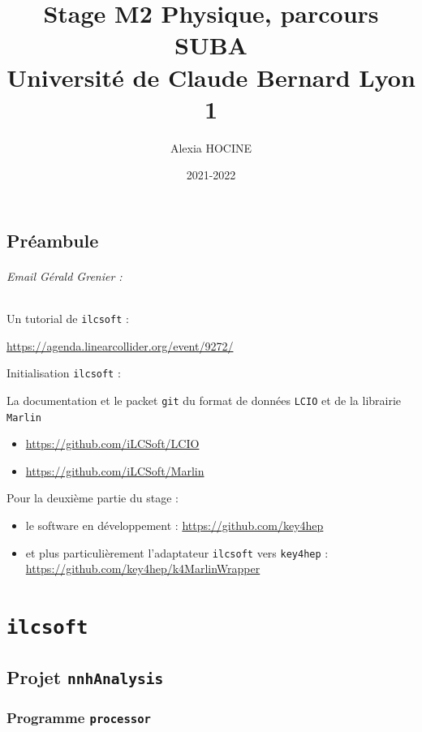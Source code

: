 \documentclass[10pt,a4paper]{report}
\author{Alexia HOCINE}
\title{Stage M2 Physique, parcours SUBA\\Université de Claude Bernard Lyon 1}
\date{2021-2022}
\newcommand{\processor}{\texttt{processor}\xspace}
\newcommand{\nnhAnalysis}{\texttt{nnhAnalysis}\xspace}
\begin{document}
\maketitle

\chapter*{Préambule}

\paragraph{Email Gérald Grenier :}

\subparagraph{Un tutorial de \texttt{ilcsoft} :} 
\url{https://agenda.linearcollider.org/event/9272/}

\subparagraph{Initialisation \texttt{ilcsoft} :}

\subparagraph{La documentation et le packet \texttt{git} du format de données \texttt{LCIO} et de la librairie \texttt{Marlin}}
\begin{itemize}
	\item \url{https://github.com/iLCSoft/LCIO}
	\item \url{https://github.com/iLCSoft/Marlin}
\end{itemize}


\subparagraph{Pour la deuxième partie du stage :}
\begin{itemize}

	\item le software en développement : 
			\url{https://github.com/key4hep}
			
	\item et plus particulièrement l'adaptateur \texttt{ilcsoft} vers \texttt{key4hep} : 
			\url{https://github.com/key4hep/k4MarlinWrapper}
			
\end{itemize}  

\part{\texttt{ilcsoft}}

\chapter{Projet \nnhAnalysis}

\section{Programme \processor}
\end{document}
